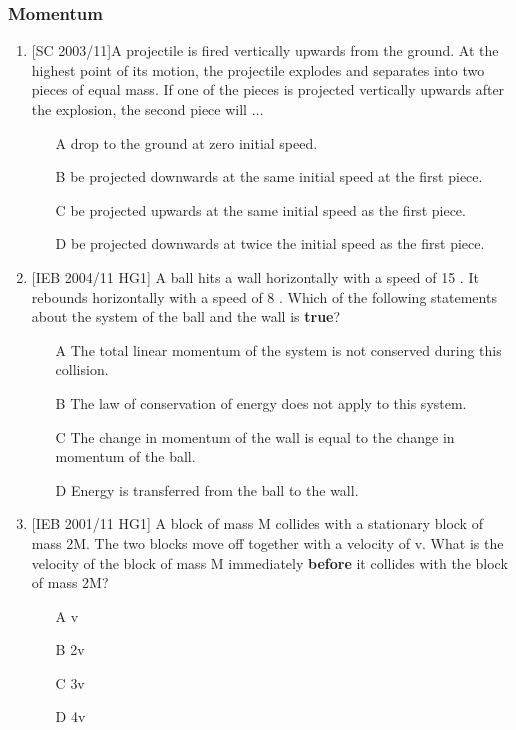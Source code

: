 \subsubsection{Momentum}
\begin{enumerate}
\item{[SC 2003/11]A projectile is fired vertically upwards from the ground. At the highest point of its motion, the projectile explodes and separates into two pieces of equal mass. If one of the pieces is projected vertically upwards after the explosion, the second piece will $\ldots$
\begin{enumerate}
\item [A]{drop to the ground at zero initial speed.}
\item [B]{be projected downwards at the same initial speed at the first piece.}
\item [C]{be projected upwards at the same initial speed as the first piece.}
\item [D]{be projected downwards at twice the initial speed as the first piece.}
\end{enumerate}}

\item{[IEB 2004/11 HG1] A ball hits a wall horizontally with a speed of 15 \ms. It rebounds horizontally with a speed of 8 \ms. Which of the following statements about the system of the ball and the wall is \textbf{true}?
\begin{enumerate}
\item [A]{The total linear momentum of the system is not conserved during this collision.}
\item [B]{The law of conservation of energy does not apply to this system.}
\item [C]{The change in momentum of the wall is equal to the change in momentum of the ball.}
\item [D]{Energy is transferred from the ball to the wall.}
\end{enumerate}}

\item{[IEB 2001/11 HG1] A block of mass M collides with a stationary block of mass 2M. The two blocks move off together with a velocity of v. What is the velocity of the block of mass M immediately \textbf{before} it collides with the block of mass 2M?
\begin{enumerate}
\item [A]{v}
\item [B]{2v}
\item [C]{3v}
\item [D]{4v}
\end{enumerate}}


\end{enumerate}
